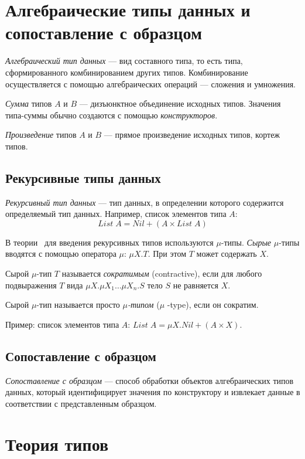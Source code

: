 \section{Алгебраические типы данных и сопоставление с образцом}

\emph{Алгебраический тип данных} — вид составного типа, то есть типа,
сформированного комбинированием других типов.
Комбинирование осуществляется с помощью алгебраических операций — сложения и умножения.

\emph{Сумма} типов $A$ и $B$ — дизъюнктное объединение исходных типов.
Значения типа-суммы обычно создаются с помощью \emph{конструкторов}.

\emph{Произведение} типов $A$ и $B$ — прямое произведение исходных типов,
кортеж типов.

\subsection{Рекурсивные типы данных}
\emph{Рекурсивный тип данных} — тип данных, в определении которого содержится
определяемый тип данных. Например, список элементов типа $A$:
$$ List\;A = Nil + (A \times List\;A) $$

В теории~\cite{TAPL} для введения рекурсивных типов используются $\mu$-типы.
\emph{Сырые} $\mu$-типы вводятся с помощью оператора $\mu$: $\mu X . T $.
При этом $T$ может содержать $X$.

\begin{definition}
Сырой $\mu$-тип $T$ называется \emph{сократимым} (contractive),
если для любого подвыражения $T$ вида $ \mu X. \mu X_1 \ldots \mu X_n . S $
тело $S$ не равняется $X$.

Сырой $\mu$-тип называется просто \emph{$\mu$-типом} ($\mu$ -type), если он сократим.
\end{definition}
Пример: список элементов типа $A$: $ List\;A = \mu X . Nil + (A \times X)$.

\subsection{Сопоставление с образцом}

\emph{Сопоставление с образцом} — способ обработки
объектов %
алгебраических типов данных, который идентифицирует значения по конструктору
и извлекает данные в соответствии с представленным образцом.

\section{Теория типов}

